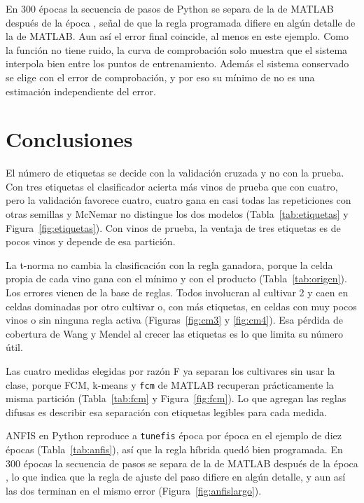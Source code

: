 \documentclass[11pt,letterpaper]{article}
\begin{document}
En 300 épocas la secuencia de pasos de Python se separa de la de MATLAB después de la época \epIguales, señal de que la regla programada difiere en algún detalle de la de MATLAB. Aun así el error final coincide, al menos en este ejemplo. Como la función no tiene ruido, la curva de comprobación solo muestra que el sistema interpola bien entre los puntos de entrenamiento. Además el sistema conservado se elige con el error de comprobación, y por eso su mínimo de \valMin{} no es una estimación independiente del error.

\section{Conclusiones}

El número de etiquetas se decide con la validación cruzada y no con la prueba. Con tres etiquetas el clasificador acierta más vinos de prueba que con cuatro, pero la validación favorece cuatro, cuatro gana en casi todas las repeticiones con otras semillas y McNemar no distingue los dos modelos (Tabla~\ref{tab:etiquetas} y Figura~\ref{fig:etiquetas}). Con \nTe{} vinos de prueba, la ventaja de tres etiquetas es de pocos vinos y depende de esa partición.

La t-norma no cambia la clasificación con la regla ganadora, porque la celda propia de cada vino gana con el mínimo y con el producto (Tabla~\ref{tab:origen}). Los errores vienen de la base de reglas. Todos involucran al cultivar 2 y caen en celdas dominadas por otro cultivar o, con más etiquetas, en celdas con muy pocos vinos o sin ninguna regla activa (Figuras~\ref{fig:cm3} y \ref{fig:cm4}). Esa pérdida de cobertura de Wang y Mendel al crecer las etiquetas es lo que limita su número útil.

Las cuatro medidas elegidas por razón F ya separan los cultivares sin usar la clase, porque FCM, k-means y \texttt{fcm} de MATLAB recuperan prácticamente la misma partición (Tabla~\ref{tab:fcm} y Figura~\ref{fig:fcm}). Lo que agregan las reglas difusas es describir esa separación con etiquetas legibles para cada medida.

ANFIS en Python reproduce a \texttt{tunefis} época por época en el ejemplo de diez épocas (Tabla~\ref{tab:anfis}), así que la regla híbrida quedó bien programada. En 300 épocas la secuencia de pasos se separa de la de MATLAB después de la época \epIguales, lo que indica que la regla de ajuste del paso difiere en algún detalle, y aun así las dos terminan en el mismo error (Figura~\ref{fig:anfislargo}).
\end{document}
